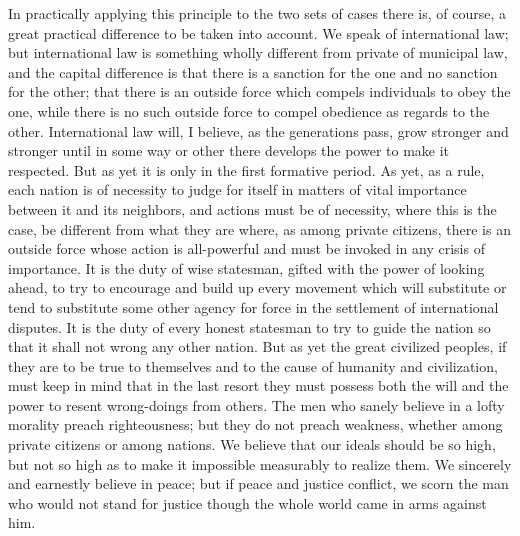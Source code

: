 \documentclass[a4paper]{amsbook}
\begin{document}
In practically applying this principle to the two sets of cases there is, of course, a great practical difference to be taken into account. We speak of international law; but international law is something wholly different from private of municipal law, and the capital difference is that there is a sanction for the one and no sanction for the other; that there is an outside force which compels individuals to obey the one, while there is no such outside force to compel obedience as regards to the other. International law will, I believe, as the generations pass, grow stronger and stronger until in some way or other there develops the power to make it respected. But as yet it is only in the first formative period. As yet, as a rule, each nation is of necessity to judge for itself in matters of vital importance between it and its neighbors, and actions must be of necessity, where this is the case, be different from what they are where, as among private citizens, there is an outside force whose action is all-powerful and must be invoked in any crisis of importance. It is the duty of wise statesman, gifted with the power of looking ahead, to try to encourage and build up every movement which will substitute or tend to substitute some other agency for force in the settlement of international disputes. It is the duty of every honest statesman to try to guide the nation so that it shall not wrong any other nation. But as yet the great civilized peoples, if they are to be true to themselves and to the cause of humanity and civilization, must keep in mind that in the last resort they must possess both the will and the power to resent wrong-doings from others. The men who sanely believe in a lofty morality preach righteousness; but they do not preach weakness, whether among private citizens or among nations. We believe that our ideals should be so high, but not so high as to make it impossible measurably to realize them. We sincerely and earnestly believe in peace; but if peace and justice conflict, we scorn the man who would not stand for justice though the whole world came in arms against him.
\end{document}
